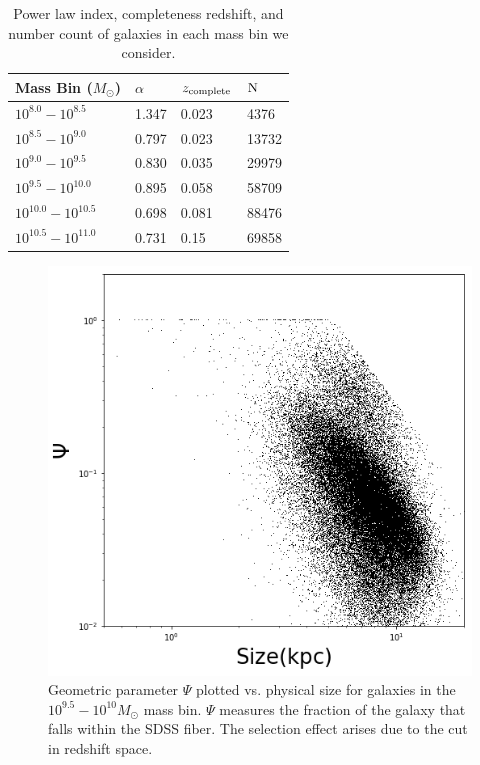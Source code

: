\documentclass[iop]{emulateapj}
\begin{document}
\begin{table}[]
	\centering
	\label{tab:infotab}
	\begin{tabular}{llll} 
	\hline 
	Mass Bin ($M_{\odot}$)& $\alpha$ & $z_{\rm complete}$ 	&  $\rm N$ \\
	\hline
	\hline 
	$10^{8.0} - 10^{8.5}$   & 1.347 & 0.023 & 4376 \\ 
	$10^{8.5} - 10^{9.0}$   & 0.797 & 0.023 & 13732\\
	$10^{9.0} - 10^{9.5}$   & 0.830  & 0.035  & 29979 \\ 
	$10^{9.5} - 10^{10.0}$   & 0.895    & 0.058 & 58709 \\
	$10^{10.0} - 10^{10.5}$   &  0.698 & 0.081 & 88476 \\
	$10^{10.5} - 10^{11.0}$   &  0.731 & 0.15 & 69858 \\
	\hline 
	\end{tabular}
		\caption{Power law index, completeness redshift, and number count of galaxies in each mass bin we consider. }
\end{table}


\begin{figure}
	\centering
	\includegraphics[width=1 \columnwidth]{geometry_9_5.png}
	\caption{Geometric parameter $\Psi$ plotted vs. physical size for galaxies in the $10^{9.5} - 10^{10} M_{\odot}$ mass bin. $\Psi$ measures the fraction of the galaxy that falls within the SDSS fiber. The selection effect arises due to the cut in redshift space.}
     \label{fig:geo}

\end{figure}
\end{document}
